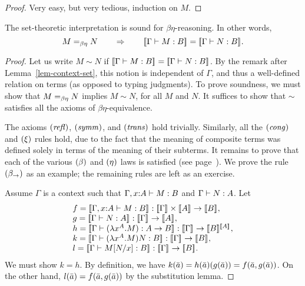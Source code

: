 \documentclass{article}
\begin{document}
\begin{proof}
  Very easy, but very tedious, induction on $M$.\eot
\end{proof}

\begin{proposition}[Soundness]
  The set-theoretic interpretation is sound for
  $\beta\eta$-reasoning. In other words,
  \[ M=_{\beta\eta} N \hspace{2em}\Rightarrow\hspace{2em} [\![\Gamma\vdash M:B]\!]_{}=[\![\Gamma\vdash N:B]\!]_{}. 
  \]
\end{proposition}

\begin{proof}
  Let us write $M\sim N$ if $[\![\Gamma\vdash M:B]\!]_{}=[\![\Gamma\vdash
    N:B]\!]_{}$. By the remark after Lemma~\ref{lem-context-set}, this
  notion is independent of $\Gamma$, and thus a well-defined relation
  on terms (as opposed to typing judgments). To prove soundness, we
  must show that $M=_{\beta\eta} N$ implies $M\sim N$, for all $M$ and $N$.
  It suffices to show that $\sim$ satisfies all the axioms of
  $\beta\eta$-equivalence.
  
  The axioms $\textrm{(\textit{refl\/})}$, $\textrm{(\textit{symm\/})}$, and $\textrm{(\textit{trans\/})}$ hold
  trivially. Similarly, all the $\textrm{(\textit{cong\/})}$ and $\textrm{(\textit{$\xi$\/})}$ rules
  hold, due to the fact that the meaning of composite terms was
  defined solely in terms of the meaning of their subterms. It remains
  to prove that each of the various $\textrm{(\textit{$\beta$\/})}$ and $\textrm{(\textit{$\eta$\/})}$
  laws is satisfied (see page~\pageref{page-typed-reductions}). We prove the rule
  $\textrm{(\textit{$\beta_{\to}$\/})}$ as an example; the remaining rules are left as
  an exercise.

  Assume $\Gamma$ is a context such that $\Gamma,x{:}A\vdash M:B$
  and $\Gamma\vdash N:A$. Let
  \[ \begin{array}{l}
    f = \semm{\Gamma,\typ{x}{A}\tj M:B}
    : \semm{\Gamma}\times\semm{A}\to\semm{B},\\
    g = \semm{\Gamma\tj N:A}
    : \semm{\Gamma}\to\semm{A}, \\
    h = \semm{\Gamma\tj (\lamabs{x}{A}.M):A\to B}
    : \semm{\Gamma}\to\semm{B}^{\semm{A}}, \\
    k = \semm{\Gamma\tj (\lamabs{x}{A}.M)N:B} :
    \semm{\Gamma}\to\semm{B},\\
    l = \semm{\Gamma\tj \subst{M}{N}{x} : B} :
    \semm{\Gamma}\to\semm{B}.
  \end{array}
  \]
  We must show $k=h$. By definition, we have $k(\bar a)=h(\bar a)(g(\bar a))=
  f(\bar a,g(\bar a))$. On the other hand, $l(\bar a)=f(\bar a,g(\bar a))$
  by the substitution lemma. \eot
\end{proof}
\end{document}
